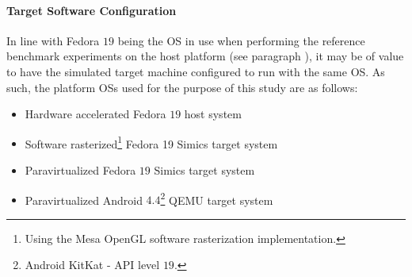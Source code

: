 \paragraph{Target Software Configuration}
\label{par:experimentalmethodology_platformconfiguration_targetsoftwareconfiguration}
In line with Fedora $19$ being the OS in use when performing the reference benchmark experiments on the host platform (see paragraph ), it may be of value to have the simulated target machine configured to run with the same OS.
As such, the platform OSs used for the purpose of this study are as follows:
\begin{itemize}[noitemsep]
	\item Hardware accelerated Fedora $19$ host system
	\item Software rasterized\footnote{Using the Mesa OpenGL software rasterization implementation.} Fedora 19 Simics target system
	\item Paravirtualized Fedora $19$ Simics target system
	\item Paravirtualized Android $4.4$\footnote{Android KitKat - API level $19$.} QEMU target system
\end{itemize}

